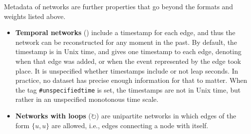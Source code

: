 \documentclass{article}
\begin{document}
Metadata of networks are further properties that go beyond the formats
and weights listed above. 
\begin{itemize}
\item \textbf{Temporal networks} (\Clocklogo) include a timestamp for each
  edge, and thus the network can be reconstructed for any moment in the
  past.  By default, the timestamp is in Unix time, and gives one
  timestamp to each edge, denoting when that edge was added, or when the
  event represented by the edge took place.  
  It is unspecified whether timestamps include or not leap seconds.  In
  practice, no dataset has precise enough information for that to matter.
  When the tag
  \texttt{\#unspecifiedtime} is set, the timestamps are not in Unix
  time, but rather in an unspecified monotonous time scale. 
\item \textbf{Networks with loops} ($\circlearrowright$) are unipartite networks in
  which edges of the form $\{u,u\}$ are allowed, i.e., edges connecting
  a node with itself. 
\end{itemize}
\end{document}
